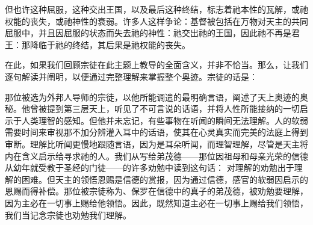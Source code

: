 但也许这种屈服，这种交出王国，以及最后这种终结，标志着祂本性的瓦解，或祂权能的丧失，或祂神性的衰弱。许多人这样争论：基督被包括在万物对天主的共同屈服中，并且因屈服的状态而失去祂的神性：祂交出祂的王国，因此祂不再是君王：那降临于祂的终结，其后果是祂权能的丧失。\par

在此，如果我们回顾宗徒在此主题上教导的全面含义，并非不恰当。那么，让我们逐句解读并阐明，以便通过完整理解来掌握整个奥迹。宗徒的话是：\par

那位被选为外邦人导师的宗徒，以他所能调遣的最明确言语，阐述了天上奥迹的奥秘。他曾被提到第三层天上，听见了不可言说的话语，并将人性所能接纳的一切启示于人类理智的感知。但他并未忘记，有些事物在听闻的瞬间无法理解。人的软弱需要时间来审视那不加分辨灌入耳中的话语，使其在心灵真实而完美的法庭上得到审断。理解比听闻更慢地跟随言语，因为是耳朵听闻，而理智理解，尽管是天主将内在含义启示给寻求祂的人。我们从写给弟茂德——那位因祖母和母亲光荣的信德从幼年就受教于圣经的门徒——的许多劝勉中读到这句话： 对理解的劝勉出于理解的困难。但天主的领悟恩赐是信德的赏报，因为通过信德，感官的软弱因启示的恩赐而得补偿。那位被宗徒称为、保罗在信德中的真子的弟茂德，被劝勉要理解，因为主必在一切事上赐给他领悟。因此，既然知道主必在一切事上赐给我们领悟，我们当记念宗徒也劝勉我们理解。\par

